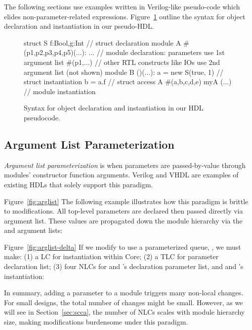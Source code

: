 The following sections use examples written in Verilog-like pseudo-code which elides non-parameter-related expressions.
Figure~\ref{fig:phdl} outline the syntax for object declaration and instantiation in our pseudo-HDL.

\begin{figure}
\centering
\begin{phdl}
struct S {f:Bool,g:Int}          // struct declaration
module A #(p1,p2,p3,p4,p5)(...): ... 
   // module declaration: parameters use 1st argument list #(p1,...)
   // other RTL constructs like IOs use 2nd argument list (not shown)
module B ()(...):
  a = new S(true, 1)             // struct instantiation
  b = a.f                        // struct access
  A #(a,b,c,d,e) myA (...)       // module instantiation
\end{phdl} 
\caption{Syntax for object declaration and instantiation in our HDL pseudocode.}
\label{fig:phdl}
\end{figure}

\subsection{Argument List Parameterization}

\emph{Argument list parameterization} is when parameters are passed-by-value through modules' constructor function arguments. 
Verilog and VHDL are examples of existing HDLs that solely support this paradigm. 

Figure~\ref{fig:arglist}
The following example illustrates how this paradigm is brittle to modifications. All top-level parameters are declared then passed directly via  argument list. These values are propagated down the module hierarchy via the  and  argument lists:

Figure~\ref{fig:arglist-delta}
If we modify  to use a parameterized queue, , we must make: (1) a LC for  instantiation within Core; (2) a TLC for  parameter declaration list; (3) four NLCs for  and 's declaration parameter list, and  and 's instantiation:

In summary, adding a parameter to a module triggers many non-local changes. For small designs, the total number of changes might be small. However, as we will see in Section~\ref{sec:scca}, the number of NLCs scales with module hierarchy size, making modifications burdensome under this paradigm.


